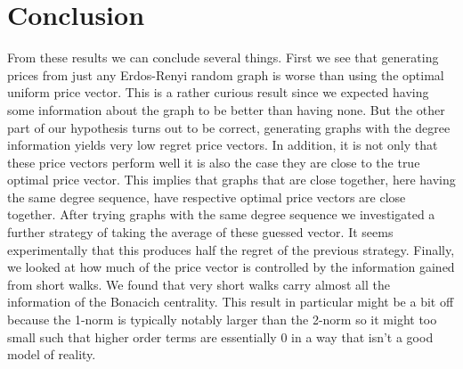 \documentclass[12pt]{article}
\begin{document}
\section{Conclusion}
From these results we can conclude several things. First we see that generating prices from just any Erdos-Renyi random graph is worse than using the optimal uniform price vector. This is a rather curious result since we expected having some information about the graph to be better than having none. But the other part of our hypothesis turns out to be correct, generating graphs with the degree information yields very low regret price vectors. In addition, it is not only that these price vectors perform well it is also the case they are close to the true optimal price vector. This implies that graphs that are close together, here having the same degree sequence, have respective optimal price vectors are close together. After trying graphs with the same degree sequence we investigated a further strategy of taking the average of these guessed vector. It seems experimentally that this produces half the regret of the previous strategy. Finally, we looked at how much of the price vector is controlled by the information gained from short walks. We found that very short walks carry almost all the information of the Bonacich centrality. This result in particular might be a bit off because the 1-norm is typically notably larger than the 2-norm so it might too small such that higher order terms are essentially 0 in a way that isn't a good model of reality.
\pagebreak



\end{document}
